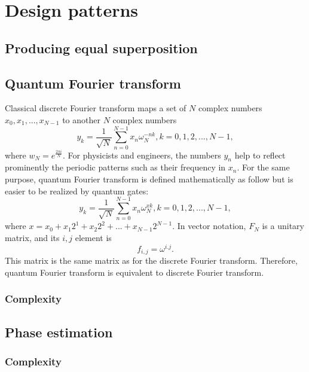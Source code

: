 \documentclass[Letter,11pt]{book}
\begin{document}
\section{Design patterns}

\subsection{Producing equal superposition}

\subsection{Quantum Fourier transform}
Classical discrete Fourier transform maps a set of $N$ complex numbers ${x_0, x_1, ..., x_{N-1}}$ to another $N$ complex numbers
\begin{equation}
    y_k = \frac 1 {\sqrt{N}} \sum^{N-1}_{n=0} x_n\omega_{N}^{-nk}, k = 0, 1, 2, ..., N-1,
\end{equation}
where $w_N = e^{\frac {2\pi i} N }$. For physicists and engineers, the numbers ${y_n}$ help to reflect prominently the periodic patterns such as their frequency in $x_n$. For the same purpose, quantum Fourier transform is defined mathematically as follow but is easier to be realized by quantum gates:
\begin{equation}
    y_k = \frac 1 {\sqrt{N}} \sum^{N-1}_{n=0} x_n\omega_{N}^{xk}, k = 0, 1, 2, ..., N-1,
\end{equation}
where $x = x_0 + x_1 2^1 + x_2 2^2 + ... +x_{N-1} 2^{N-1}$. In vector notation, $F_N$ is a unitary matrix, and its $i, j$ element is
\begin{equation}
    f_{i,j} = \omega^{i.j}.
\end{equation}
This matrix is the same matrix as for the discrete Fourier transform. Therefore, quantum Fourier transform is equivalent to discrete Fourier transform.

\subsubsection{Complexity}

\subsection{Phase estimation}
\subsubsection{Complexity}
\end{document}
